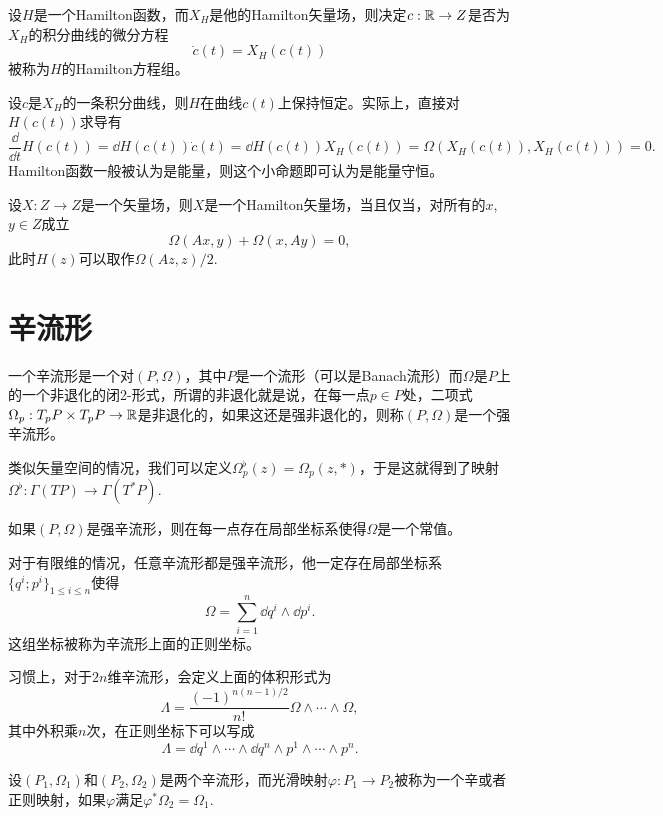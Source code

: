 \begin{para}
	设$H$是一个Hamilton函数，而$X_H$是他的Hamilton矢量场，则决定$c:\mathbb{R} \to Z$是否为$X_H$的积分曲线的微分方程
	\[
	\dot c(t)=X_H(c(t))
	\]
	被称为$H$的Hamilton方程组。

	设$c$是$X_H$的一条积分曲线，则$H$在曲线$c(t)$上保持恒定。实际上，直接对$H\left(c(t)\right)$求导有
	\[
	\frac{\dd}{\dd t}H(c(t))=\dd H(c(t))\dot c(t)=\dd H(c(t))X_H\left(c(t)\right)=\Omega\left(X_H\left(c(t)\right),X_H\left(c(t)\right)\right)=0.
	\]
	Hamilton函数一般被认为是能量，则这个小命题即可认为是能量守恒。
\end{para}

\begin{thm}
	设$X:Z\to Z$是一个矢量场，则$X$是一个Hamilton矢量场，当且仅当，对所有的$x$, $y\in Z$成立
	\[
	\Omega(Ax,y)+\Omega(x,Ay)=0,
	\]
	此时$H(z)$可以取作$\Omega(Az,z)/2$.
\end{thm}

\section{辛流形}

\begin{para}
	一个辛流形是一个对$(P,\Omega)$，其中$P$是一个流形（可以是Banach流形）而$\Omega$是$P$上的一个非退化的闭2-形式，所谓的非退化就是说，在每一点$p\in P$处，二项式$\Omega_p:T_pP\times T_p P\to \mathbb{R}$是非退化的，如果这还是强非退化的，则称$(P,\Omega)$是一个强辛流形。

	类似矢量空间的情况，我们可以定义$\Omega_p^\flat(z)=\Omega_p(z,*)$，于是这就得到了映射$\Omega^\flat : \Gamma(TP)\to \Gamma(T^*P)$. 
\end{para}

\begin{thm}
	如果$(P,\Omega)$是强辛流形，则在每一点存在局部坐标系使得$\Omega$是一个常值。
\end{thm}

对于有限维的情况，任意辛流形都是强辛流形，他一定存在局部坐标系$\{q^i;p^i\}_{1\leq i \leq n}$使得
\[
	\Omega=\sum_{i=1}^n \dd q^i\wedge \dd p^i.
\]
这组坐标被称为辛流形上面的正则坐标。

习惯上，对于$2n$维辛流形，会定义上面的体积形式为
\[
	\Lambda =\frac{(-1)^{n(n-1)/2}}{n!} \Omega\wedge\cdots \wedge \Omega,
\]
其中外积乘$n$次，在正则坐标下可以写成
\[
	\Lambda = \dd q^1\wedge \cdots \wedge \dd q^n\wedge p^1\wedge \cdots\wedge p^n.
\]

\begin{para}[辛变换]
	设$(P_1,\Omega_1)$和$(P_2,\Omega_2)$是两个辛流形，而光滑映射$\varphi:P_1\to P_2$被称为一个辛或者正则映射，如果$\varphi$满足$\varphi^*\Omega_2=\Omega_1$.
\end{para}

